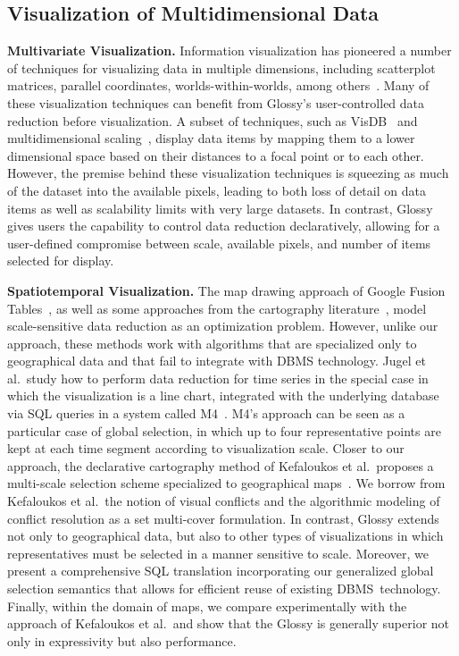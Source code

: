 \documentclass[11pt, oneside]{report}
\newcommand{\minisec}[1]{\noindent\textbf{#1.}}
\begin{document}
\subsection{Visualization of Multidimensional Data}
\label{sec:related:multidimensional}

\minisec{Multivariate Visualization}
Information visualization has pioneered a number of techniques for visualizing data in multiple dimensions, including scatterplot matrices, parallel coordinates, worlds-within-worlds, among others~\cite{CardMacS99:InfoVizBook,WongB94:InfoVizSurvey}. Many of these visualization techniques can benefit from Glossy's user-controlled data reduction before visualization. A subset of techniques, such as VisDB~\cite{KeimK95:VisDB} and multidimensional scaling~\cite{KruskalW78:MDS}, display data items by mapping them to a lower dimensional space based on their distances to a focal point or to each other. However, the premise behind these visualization techniques is squeezing as much of the dataset into the available pixels, leading to both loss of detail on data items as well as scalability limits with very large datasets. In contrast, Glossy gives users the capability to control data reduction declaratively, allowing for a user-defined compromise between scale, available pixels, and number of items selected for display.   

\minisec{Spatiotemporal Visualization}
The map drawing approach of Google Fusion Tables~\cite{DasSarmaLGMH12:FusionTables}, as well as some approaches from the cartography literature~\cite{NeunBW09:GeneralizationWeb,WareJT03:GeneralizationMeta}, model scale-sensitive data reduction as an optimization problem. However, unlike our approach, these methods work with algorithms that are specialized only to geographical data and that fail to integrate with DBMS technology. Jugel et al.~study how to perform data reduction for time series in the special case in which the visualization is a line chart, integrated with the underlying database via SQL queries in a system called M4~\cite{jugel:m4}. M4's approach can be seen as a particular case of global selection, in which up to four representative points are kept at each time segment according to visualization scale. Closer to our approach, the declarative cartography method of Kefaloukos et al.~proposes a multi-scale selection scheme specialized to geographical maps~\cite{KefaloukosSZ14:CVL}. We borrow from Kefaloukos et al.~the notion of visual conflicts and the algorithmic modeling of conflict resolution as a set multi-cover formulation. In contrast, Glossy extends not only to geographical data, but also to other types of visualizations in which representatives must be selected in a manner sensitive to scale. Moreover, we present a comprehensive SQL translation incorporating our generalized global selection semantics that allows for efficient reuse of existing DBMS~technology. Finally, within the domain of maps, we compare experimentally with the approach of Kefaloukos et al.~and show that the Glossy is generally superior not only in expressivity but also performance.    
\end{document}
